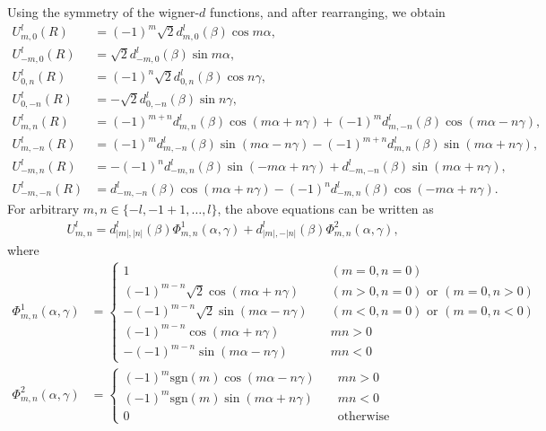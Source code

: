 \documentclass[onecolumn,11pt]{IEEEtran}
\begin{document}
Using the symmetry of the wigner-$d$ functions, and after rearranging, we obtain 
\begin{align}
    U^l_{m,0} (R) &= (-1)^m \sqrt{2} d^l_{m,0}(\beta) \cos m\alpha,\label{eqn:U_lm0} \\
    U^l_{-m,0} (R) &= \sqrt{2} d^l_{-m,0}(\beta) \sin m\alpha,\\
    U^l_{0,n} (R) &= (-1)^{n} \sqrt{2} d^l_{0,n}(\beta) \cos n\gamma, \\ 
    U^l_{0,-n} (R) &= -\sqrt{2} d^l_{0,-n}(\beta) \sin n\gamma,\\
    U^l_{m,n} (R) &= (-1)^{m+n} d^l_{m,n}(\beta) \cos (m\alpha + n\gamma) + (-1)^m d^l_{m,-n}(\beta) \cos(m\alpha - n\gamma),\\
    U^l_{m,-n} (R) & = (-1)^{m} d^l_{m,-n}(\beta) \sin(m\alpha-n\gamma) - (-1)^{m+n} d^l_{m,n}(\beta)\sin(m\alpha+n\gamma),\\
    U^l_{-m,n} (R) & = -(-1)^n d^l_{-m,n}(\beta) \sin(-m\alpha+n\gamma) + d^l_{-m,-n}(\beta) \sin(m\alpha+n\gamma),\\
    U^l_{-m,-n} (R) & = d^l_{-m,-n}(\beta) \cos (m\alpha + n\gamma) - (-1)^n d^l_{-m,n}(\beta) \cos(-m\alpha + n\gamma).\label{eqn:U_lmmmn}
\end{align} 
For arbitrary $m,n\in\{-l,-1+1,\ldots,l\}$, the above equations can be written as 
\begin{align*}
    U^l_{m,n} =  d^l_{|m|,|n|}(\beta) \Phi^1_{m,n}(\alpha,\gamma) + d^l_{|m|,-|n|}(\beta) \Phi^2_{m,n}(\alpha,\gamma),
\end{align*}
where
\begin{align*}
    \Phi^1_{m,n}(\alpha,\gamma) 
    & =\begin{cases}
    1 \quad &(m=0,n=0)\\
    (-1)^{m-n}\sqrt{2} \cos(m\alpha+n\gamma) \quad & (m>0,n=0) \text{ or } (m=0,n>0)\\
    -(-1)^{m-n}\sqrt{2} \sin(m\alpha-n\gamma) \quad & (m<0,n=0) \text{ or } (m=0,n<0)\\
    (-1)^{m-n} \cos(m\alpha+n\gamma) \quad & mn >0 \\
    -(-1)^{m-n} \sin(m\alpha-n\gamma) \quad & mn < 0 
\end{cases}\\
\Phi^2_{m,n}(\alpha,\gamma) 
    & =\begin{cases}
(-1)^{m}\mathrm{sgn}(m) \cos(m\alpha-n\gamma) \quad & mn >0 \\
(-1)^{m}\mathrm{sgn}(m) \sin(m\alpha+n\gamma) \quad & mn <0\\
0 & \text{otherwise}
    \end{cases}
\end{align*}
\end{document}
